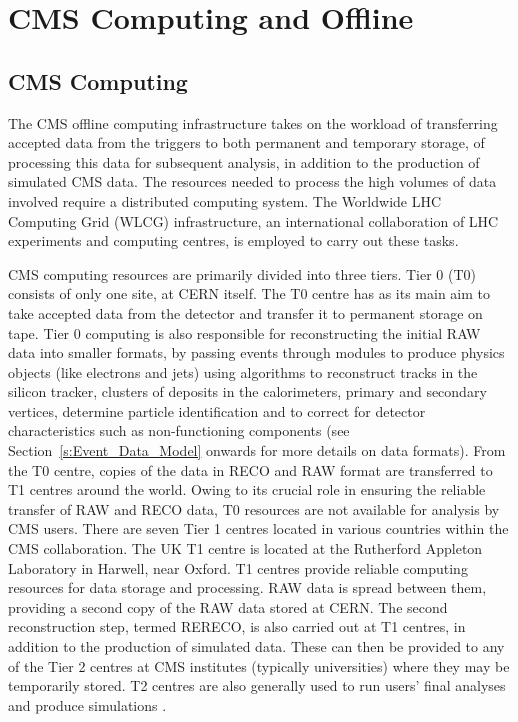 \chapter{CMS Computing and Offline}
\label{c:CMS_computing_and_offline}

\section{CMS Computing}
\label{s:CMS_computing}

The CMS offline computing infrastructure takes on the workload of transferring accepted data from the triggers
to both permanent and temporary storage, of processing this data for subsequent analysis, in addition to the
production of simulated CMS data. The resources needed to process the high volumes of data involved require a
distributed computing system. The Worldwide LHC Computing Grid (WLCG) infrastructure, an international
collaboration of LHC experiments and computing centres, is employed to carry out these tasks.

CMS computing resources are primarily divided into three tiers. Tier 0 (T0) consists of only one site, at CERN
itself. The T0 centre has as its main aim to take accepted data from the detector and transfer it to permanent
storage on tape. Tier 0 computing is also responsible for reconstructing the initial RAW data into smaller
formats, by passing events through modules to produce physics objects (like electrons and jets) using
algorithms to reconstruct tracks in the silicon tracker, clusters of deposits in the calorimeters, primary and
secondary vertices, determine particle identification and to correct for detector characteristics such as
non-functioning components (see Section~\ref{s:Event_Data_Model} onwards for more details on data formats).
From the T0 centre, copies of the data in RECO and RAW format are transferred to T1 centres around the world.
Owing to its crucial role in ensuring the reliable transfer of RAW and RECO data, T0 resources are not
available for analysis by CMS users. There are seven Tier 1 centres located in various countries within the
CMS collaboration. The UK T1 centre is located at the Rutherford Appleton Laboratory in Harwell, near Oxford.
T1 centres provide reliable computing resources for data storage and processing. RAW data is spread between
them, providing a second copy of the RAW data stored at CERN. The second reconstruction step, termed RERECO,
is also carried out at T1 centres, in addition to the production of simulated data. These can then be provided
to any of the Tier 2 centres at CMS institutes (typically universities) where they may be temporarily stored.
T2 centres are also generally used to run users' final analyses and produce simulations
\cite{CMS_experiment,CMS_TDR1}.

